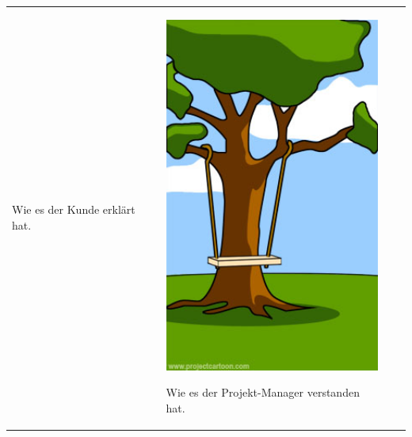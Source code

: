 \begin{tabularx}{\textwidth}{XXXX}
\begin{minipage}[t]{0.23\textwidth}
\begin{center}
Wie es der Kunde erklärt hat.
\end{center}
\end{minipage}
&
\begin{minipage}[t]{0.23\textwidth}
\begin{center}
\includegraphics[width=1.0\textwidth]{./inf/SEKII/29_Softwaretechnik/PM_02.jpg}

Wie es der Projekt-Manager verstanden hat.


\end{center}
\end{minipage}
\end{tabularx}
